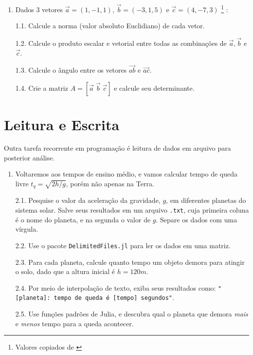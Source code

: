 \documentclass[
  letterpaper,
  DIV=11,
  numbers=noendperiod]{scrreprt}
\begin{document}
\begin{enumerate}
\def\labelenumi{\arabic{enumi}.}
\item
  Dados 3 vetores \(\vec{a} = (1,-1,1)\), \(\vec{b} = (-3,1,5)\) e
  \(\vec{c} = (4,-7,3)\) \footnote{Valores copiados de \cite{p1_ex2}} :

  1.1. Calcule a norma (valor absoluto Euclidiano) de cada vetor.

  1.2. Calcule o produto escalar e vetorial entre todas as combinações
  de \(\vec{a},\vec{b}\) e \(\vec{c}\).

  1.3. Calcule o ângulo entre os vetores \(\vec{ab}\) e \(\vec{ac}\).

  1.4. Crie a matriz \(A = [\vec{a}\; \vec{b}\; \vec{c}]\) e calcule seu
  determinante.
\end{enumerate}

\hypertarget{leitura-e-escrita}{%
\section{Leitura e Escrita}\label{leitura-e-escrita}}

Outra tarefa recorrente em programação é leitura de dados em arquivo
para posterior análise.

\begin{enumerate}
\def\labelenumi{\arabic{enumi}.}
\setcounter{enumi}{1}
\item
  Voltaremos aos tempos de ensino médio, e vamos calcular tempo de queda
  livre \(t_q = \sqrt{2h/g}\), porém não apenas na Terra.

  2.1. Pesquise o valor da aceleração da gravidade, \(g\), em diferentes
  planetas do sistema solar. Salve seus resultados em um arquivo
  \texttt{.txt}, cuja primeira coluna é o nome do planeta, e na segunda
  o valor de \(g\). Separe os dados com uma vírgula.

  2.2. Use o pacote \texttt{DelimitedFiles.jl} para ler os dados em uma
  matriz.

  2.3. Para cada planeta, calcule quanto tempo um objeto demora para
  atingir o solo, dado que a altura inicial é \(h=120 m\).

  2.4. Por meio de interpolação de texto, exiba seus resultados como:
  \texttt{"{[}planeta{]}:\ tempo\ de\ queda\ é\ {[}tempo{]}\ segundos"}.

  2.5. Use funções padrões de Julia, e descubra qual o planeta que
  demora \emph{mais} e \emph{menos} tempo para a queda acontecer.
\end{enumerate}
\end{document}

